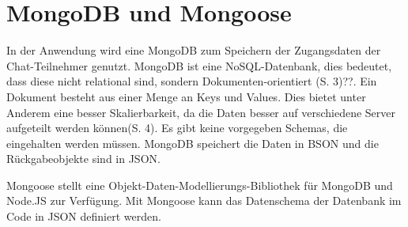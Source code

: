\section{MongoDB und Mongoose}\label{sec:MongoDB}
In der Anwendung wird eine MongoDB zum Speichern der Zugangsdaten der Chat-Teilnehmer genutzt.
MongoDB ist eine NoSQL-Datenbank, dies bedeutet, dass diese nicht relational sind, sondern Dokumenten-orientiert (S. 3)??. Ein Dokument besteht aus einer Menge an Keys und Values.
Dies bietet unter Anderem eine besser Skalierbarkeit, da die Daten besser auf verschiedene Server aufgeteilt werden können(S. 4). Es gibt keine vorgegeben Schemas, die eingehalten werden müssen. MongoDB speichert die Daten in BSON und die Rückgabeobjekte sind in JSON.


Mongoose stellt eine Objekt-Daten-Modellierungs-Bibliothek für MongoDB und Node.JS zur Verfügung.
Mit Mongoose kann das Datenschema der Datenbank im Code in JSON definiert werden.

